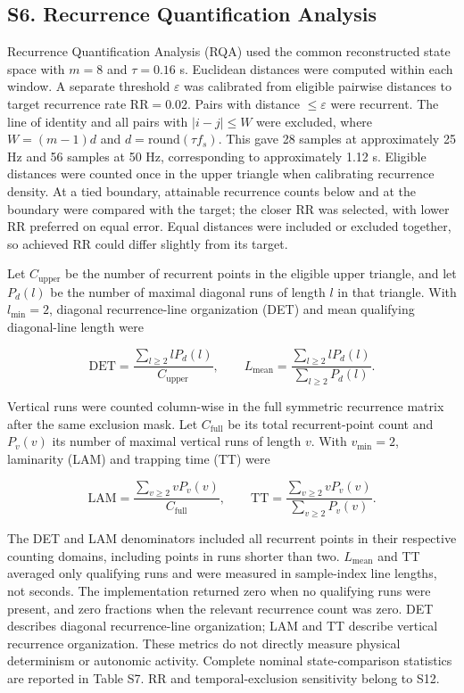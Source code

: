 \subsection*{S6. Recurrence Quantification Analysis}

Recurrence Quantification Analysis (RQA) used the common reconstructed state space with $m=8$ and $\tau=0.16$ s. Euclidean distances were computed within each window. A separate threshold $\varepsilon$ was calibrated from eligible pairwise distances to target recurrence rate $\mathrm{RR}=0.02$. Pairs with distance $\leq\varepsilon$ were recurrent. The line of identity and all pairs with $|i-j|\leq W$ were excluded, where $W=(m-1)d$ and $d=\mathrm{round}(\tau f_s)$. This gave 28 samples at approximately 25 Hz and 56 samples at 50 Hz, corresponding to approximately 1.12 s. Eligible distances were counted once in the upper triangle when calibrating recurrence density. At a tied boundary, attainable recurrence counts below and at the boundary were compared with the target; the closer RR was selected, with lower RR preferred on equal error. Equal distances were included or excluded together, so achieved RR could differ slightly from its target.

Let $C_{\mathrm{upper}}$ be the number of recurrent points in the eligible upper triangle, and let $P_d(l)$ be the number of maximal diagonal runs of length $l$ in that triangle. With $l_{\min}=2$, diagonal recurrence-line organization (DET) and mean qualifying diagonal-line length were

\[
\mathrm{DET}=\frac{\sum_{l\geq2}lP_d(l)}{C_{\mathrm{upper}}},\qquad L_{\mathrm{mean}}=\frac{\sum_{l\geq2}lP_d(l)}{\sum_{l\geq2}P_d(l)}.
\]

Vertical runs were counted column-wise in the full symmetric recurrence matrix after the same exclusion mask. Let $C_{\mathrm{full}}$ be its total recurrent-point count and $P_v(v)$ its number of maximal vertical runs of length $v$. With $v_{\min}=2$, laminarity (LAM) and trapping time (TT) were

\[
\mathrm{LAM}=\frac{\sum_{v\geq2}vP_v(v)}{C_{\mathrm{full}}},\qquad \mathrm{TT}=\frac{\sum_{v\geq2}vP_v(v)}{\sum_{v\geq2}P_v(v)}.
\]

The DET and LAM denominators included all recurrent points in their respective counting domains, including points in runs shorter than two. $L_{\mathrm{mean}}$ and TT averaged only qualifying runs and were measured in sample-index line lengths, not seconds. The implementation returned zero when no qualifying runs were present, and zero fractions when the relevant recurrence count was zero. DET describes diagonal recurrence-line organization; LAM and TT describe vertical recurrence organization. These metrics do not directly measure physical determinism or autonomic activity. Complete nominal state-comparison statistics are reported in Table S7. RR and temporal-exclusion sensitivity belong to S12.

